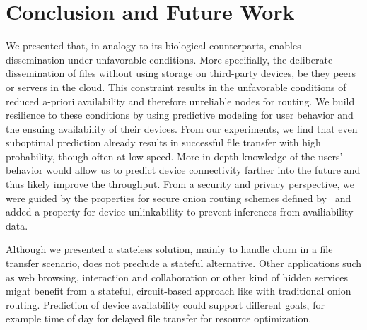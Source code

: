 \section{Conclusion and Future Work}%
\label{conclusion}

We presented \name that, in analogy to its biological
counterparts, enables dissemination under unfavorable conditions. More
specifially, the deliberate dissemination of files without using
storage on third-party devices, be they peers or servers in the
cloud. This constraint results in the unfavorable conditions of
reduced a-priori availability and therefore unreliable nodes for
routing. We build resilience to these conditions by using predictive
modeling for user behavior and the ensuing availability of their
devices. From our experiments, we find that even suboptimal prediction
already results in successful file transfer with high probability,
though often at low speed. More in-depth knowledge of the users'
behavior would allow us to predict device connectivity farther into
the future and thus likely improve the throughput. From a security and
privacy perspective, we were guided by the properties for secure onion
routing schemes defined by~\cite{CLOnionRouting} and added a property
for device-unlinkability to prevent inferences from availiability data.

Although we presented a stateless solution, mainly to handle churn in
a file transfer scenario, \name does not preclude a stateful alternative. 
Other applications such as web browsing, interaction and
collaboration or other kind of hidden services might benefit from a stateful, circuit-based approach
like with traditional onion routing. Prediction of device availability
could support different goals, for example time of day for delayed
file transfer for resource optimization. 


